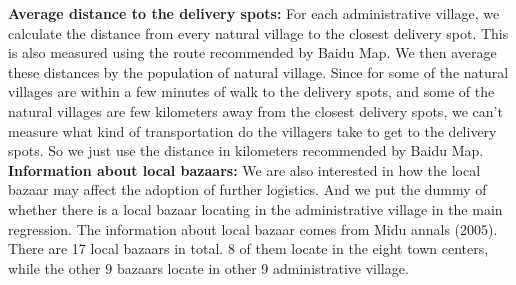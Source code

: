 \documentclass{article}
\begin{document}
{\bfseries Average distance to the delivery spots:} For each administrative village, we calculate the distance from every natural village to the closest delivery spot. This is also measured using the route recommended by Baidu Map. We then average these distances by the population of natural village. Since for some of the natural villages are within a few minutes of walk to the delivery spots, and some of the natural villages are few kilometers away from the closest delivery spots, we can’t measure what kind of transportation do the villagers take to get to the delivery spots. So we just use the distance in kilometers recommended by Baidu Map.\\
{\bfseries Information about local bazaars:} We are also interested in how the local bazaar may affect the adoption of further logistics. And we put the dummy of whether there is a local bazaar locating in the administrative village in the main regression. The information about local bazaar comes from Midu annals (2005). There are 17 local bazaars in total. 8 of them locate in the eight town centers, while the other 9 bazaars locate in other 9 administrative village.\\
\end{document}

